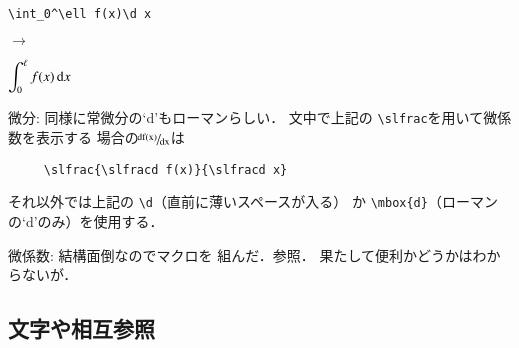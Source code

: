 \documentclass[dvipdfmx,onecolumn]{jsce}  %
\begin{document}
\begin{Description}
\noindent
\mbox{}\hfill
\begin{minipage}[c]{.3\textwidth}
\renewcommand{\baselinestretch}{0.75}\small\normalsize
\begin{verbatim}
\int_0^\ell f(x)\d x
\end{verbatim}
\renewcommand{\baselinestretch}{1}\small\normalsize
\end{minipage}
\hfill$\to$\hfill
\begin{minipage}[c]{.3\textwidth}
$\displaystyle\int_0^\ell f(x)\,\mbox{d} x$
\end{minipage}
\hfill\mbox{}
\medskip
%
\item[微分:] 同様に常微分の`d'もローマンらしい．
文中で上記の \verb+\slfrac+を用いて微係数を表示する
場合の$\slfrac{\slfracd f(x)}{\slfracd x}$は
\begin{verbatim}
     \slfrac{\slfracd f(x)}{\slfracd x}
\end{verbatim}
それ以外では上記の \verb+\d+（直前に薄いスペースが入る）
か \verb+\mbox{d}+（ローマンの`d'のみ）を使用する．
%
\item[微係数:] 結構面倒なのでマクロを
組んだ．\tabno{\ref{tab:derivative}}参照．
果たして便利かどうかはわからないが．
\end{Description}

\subsection{文字や相互参照}
\label{sec:koko}
\end{document}
